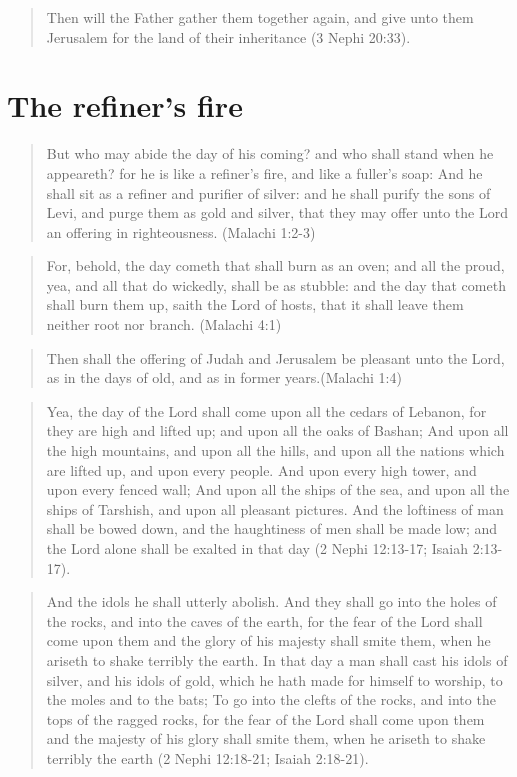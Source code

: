 \begin{quotation}
Then will the Father gather them together again, and give unto them Jerusalem for the land of their inheritance (3 Nephi 20:33).
\end{quotation}


\section{The refiner's fire}

\begin{quotation}
But who may abide the day of his coming? and who shall stand when he appeareth? for he is like a refiner's fire, and like a fuller's soap: And he shall sit as a refiner and purifier of silver: and he shall purify the sons of Levi, and purge them as gold and silver, that they may offer unto the Lord an offering in righteousness. (Malachi 1:2-3)
\end{quotation}

\begin{quotation}
For, behold, the day cometh that shall burn as an oven; and all the proud, yea, and all that do wickedly, shall be as stubble: and the day that cometh shall burn them up, saith the Lord of hosts, that it shall leave them neither root nor branch. (Malachi 4:1)
\end{quotation}

\begin{quotation}
Then shall the offering of Judah and Jerusalem be pleasant unto the Lord, as in the days of old, and as in former years.(Malachi 1:4)
\end{quotation}

\begin{quotation}
Yea, the day of the Lord shall come upon all the cedars of Lebanon, for they are high and lifted up; and upon all the oaks of Bashan; And upon all the high mountains, and upon all the hills, and upon all the nations which are lifted up, and upon every people. And upon every high tower, and upon every fenced wall; And upon all the ships of the sea, and upon all the ships of Tarshish, and upon all pleasant pictures. And the loftiness of man shall be bowed down, and the haughtiness of men shall be made low; and the Lord alone shall be exalted in that day (2 Nephi 12:13-17; Isaiah 2:13-17).
\end{quotation}

\begin{quotation}
And the idols he shall utterly abolish. And they shall go into the holes of the rocks, and into the caves of the earth, for the fear of the Lord shall come upon them and the glory of his majesty shall smite them, when he ariseth to shake terribly the earth. In that day a man shall cast his idols of silver, and his idols of gold, which he hath made for himself to worship, to the moles and to the bats; To go into the clefts of the rocks, and into the tops of the ragged rocks, for the fear of the Lord shall come upon them and the majesty of his glory shall smite them, when he ariseth to shake terribly the earth (2 Nephi 12:18-21; Isaiah 2:18-21).
\end{quotation}


